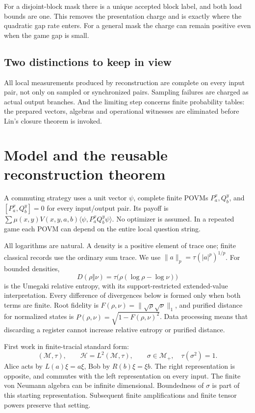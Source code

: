 \documentclass[11pt,reqno]{amsart}
\numberwithin{equation}{section}
\begin{document}
For a disjoint-block mask there is a unique accepted block label, and both load bounds are one. This removes the presentation charge and is exactly where the quadratic gap rate enters. For a general mask the charge can remain positive even when the game gap is small.

\subsection{Two distinctions to keep in view}\label{two-distinctions-to-keep-in-view}

All local measurements produced by reconstruction are complete on every input pair, not only on sampled or synchronized pairs. Sampling failures are charged as actual output branches. And the limiting step concerns finite probability tables: the prepared vectors, algebras and operational witnesses are eliminated before Lin's closure theorem is invoked.

\section{Model and the reusable reconstruction theorem}\label{model-and-the-reusable-reconstruction-theorem}

A commuting strategy uses a unit vector \(\psi\), complete finite POVMs \(P_a^x,Q_b^y\), and \([P_a^x,Q_b^y]=0\) for every input/output pair. Its payoff is \(\sum\mu(x,y)V(x,y,a,b)\langle\psi,P_a^xQ_b^y\psi\rangle\). No optimizer is assumed. In a repeated game each POVM can depend on the entire local question string.

All logarithms are natural. A density is a positive element of trace one; finite classical records use the ordinary sum trace. We use \(\|a\|_p=\tau(|a|^p)^{1/p}\). For bounded densities, \[
 D(\rho\Vert\nu)=\tau\bigl(\rho(\log\rho-\log\nu)\bigr)
\] is the Umegaki relative entropy, with its support-restricted extended-value interpretation. Every difference of divergences below is formed only when both terms are finite. Root fidelity is \(F(\rho,\nu)=\|\sqrt\rho\sqrt\nu\|_1\), and purified distance for normalized states is \(P(\rho,\nu)=\sqrt{1-F(\rho,\nu)^2}\). Data processing means that discarding a register cannot increase relative entropy or purified distance.

First work in finite-tracial standard form: \[
 (\mathcal M,\tau),\qquad
 \mathcal H=L^2(\mathcal M,\tau),\qquad
 \sigma\in\mathcal M_+,\quad\tau(\sigma^2)=1.
\] Alice acts by \(L(a)\xi=a\xi\), Bob by \(R(b)\xi=\xi b\). The right representation is opposite, and commutes with the left representation on every input. The finite von Neumann algebra can be infinite dimensional. Boundedness of \(\sigma\) is part of this starting representation. Subsequent finite amplifications and finite tensor powers preserve that setting.
\end{document}
